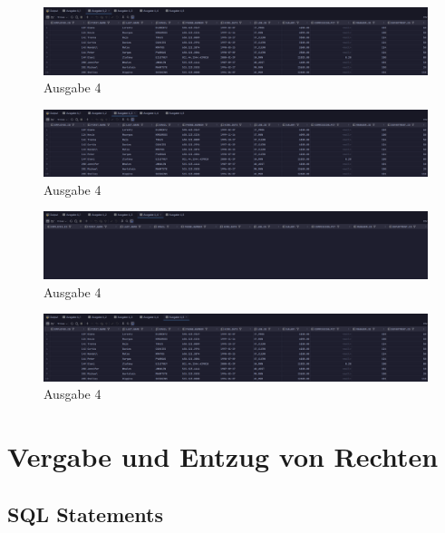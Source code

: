 \documentclass[12pt]{scrartcl}
\begin{document}
\begin{figure}[H]
	\centering
	\includegraphics[width=1\textwidth]{../4_2.png}
	\caption{Ausgabe 4}
\end{figure}

\begin{figure}[H]
	\centering
	\includegraphics[width=1\textwidth]{../4_3.png}
	\caption{Ausgabe 4}
\end{figure}

\begin{figure}[H]
	\centering
	\includegraphics[width=1\textwidth]{../4_4.png}
	\caption{Ausgabe 4}
\end{figure}

\begin{figure}[H]
	\centering
	\includegraphics[width=1\textwidth]{../4_5.png}
	\caption{Ausgabe 4}
\end{figure}

\pagebreak

\section{Vergabe und Entzug von Rechten}

\subsection{SQL Statements}
\inputminted{sql}{../ue6_5.sql}
\end{document}
